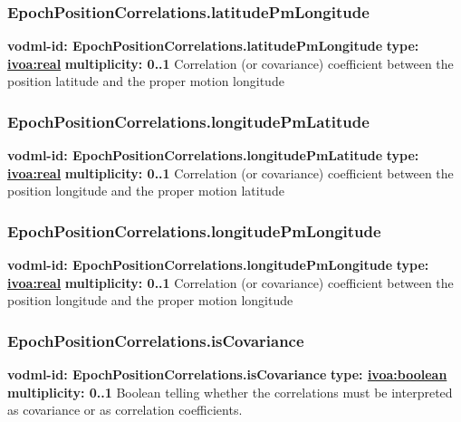     \subsubsection{EpochPositionCorrelations.latitudePmLongitude}
      \textbf{vodml-id: EpochPositionCorrelations.latitudePmLongitude} \newline
      \textbf{type: \hyperref[sect:ivoa]{ivoa:real}} \newline
      \textbf{multiplicity: 0..1} \newline
      Correlation (or covariance) coefficient between the position latitude and the proper motion longitude

    \subsubsection{EpochPositionCorrelations.longitudePmLatitude}
      \textbf{vodml-id: EpochPositionCorrelations.longitudePmLatitude} \newline
      \textbf{type: \hyperref[sect:ivoa]{ivoa:real}} \newline
      \textbf{multiplicity: 0..1} \newline
      Correlation (or covariance) coefficient between the position longitude and the proper motion latitude

    \subsubsection{EpochPositionCorrelations.longitudePmLongitude}
      \textbf{vodml-id: EpochPositionCorrelations.longitudePmLongitude} \newline
      \textbf{type: \hyperref[sect:ivoa]{ivoa:real}} \newline
      \textbf{multiplicity: 0..1} \newline
      Correlation (or covariance) coefficient between the position longitude and the proper motion longitude

    \subsubsection{EpochPositionCorrelations.isCovariance}
      \textbf{vodml-id: EpochPositionCorrelations.isCovariance} \newline
      \textbf{type: \hyperref[sect:ivoa]{ivoa:boolean}} \newline
      \textbf{multiplicity: 0..1} \newline
      Boolean telling whether the correlations must be interpreted as covariance or as correlation coefficients.

